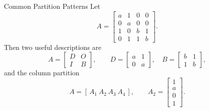 \begin{frame}{Common Partition Patterns}
Let
\[
A=\begin{bmatrix}
a&1&0&0\\
0&a&0&0\\
1&0&b&1\\
0&1&1&b
\end{bmatrix}.
\]
Then two useful descriptions are
\[
A=\begin{bmatrix}D&O\\I&B\end{bmatrix},\qquad
D=\begin{bmatrix}a&1\\0&a\end{bmatrix},\quad
B=\begin{bmatrix}b&1\\1&b\end{bmatrix},
\]
and the column partition
\[
A=[\,A_1\ A_2\ A_3\ A_4\,],\qquad
A_2=\begin{bmatrix}1\\a\\0\\1\end{bmatrix}.
\]
\end{frame}
